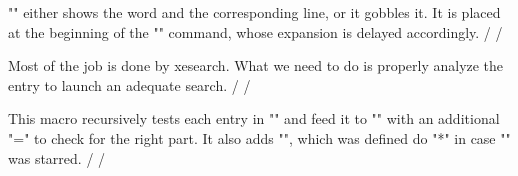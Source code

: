 \documentclass[%
]{codedoc}
\begin{document}
\DefineMacro\xi@Mark
\DefineMacro\xi@empty
\DefineMacro\xi@end
\DefineMacro\xi@Lists
"\xi@Mark" either shows the word and the corresponding line,
or it gobbles it. It is placed at the beginning of
the "\index" command, whose expansion is delayed accordingly.
/
\ifxi@mark
  \def\xi@Mark#1{***[#1:\the\inputlineno] }
\else
  \def\xi@Mark#1{}
\fi
\def\xi@empty{}
\def\xi@end{\xi@end}
\def\xi@Lists{}
/

\DefineMacro\IndexList
\DefineMacro\xi@IndexList
Most of the job is done by xesearch. What we need to do
is properly analyze the entry to launch an adequate search.
/
\def\IndexList{%
  \@ifstar{\def\xi@cs{*}\xi@IndexList}{\def\xi@cs{}\xi@IndexList}%
  }
\def\xi@IndexList#1#2{%
  \def\xi@ListName{#1}%
  \edef\xi@Lists{\xi@Lists#1,}%
  \unless\ifcsname#1@xeindex\endcsname
    \csname#1@xeindex\endcsname
/

\noindent
When a index list is created, we associate five xesearch
lists with it: one is for words and affixes that should index
themselves in lower case.
/
    \SearchList{#1@xeindex@ncs@normal@list}{%
      \def\xi@Word{##1}%
      \lowercase{\expandafter\index\expandafter{\xi@Mark\xi@Word##1}}}{}%
/

\noindent
Another one is for case-sensitive words and affixes.
/
    \SearchList{#1@xeindex@cs@normal@list}{%
      \expandafter\index\expandafter{\xi@Mark{##1}##1}}{}%
/

\noindent
And the last three are for words and affixes that launch
a special entry, which is stored in an associated command.
/
    \SearchList{#1@xeindex@ncs@special@list}{%
      \lowercase{\csname##1@#1@xeindex@entry\endcsname}{##1}}{}%
    \SearchList{#1@xeindex@cs@special@list}{%
      \csname##1@#1@xeindex@entry\endcsname{##1}}{}%
    \SearchList{#1@xeindex@affix@special@list}{%
      \csname\AffixFound @#1@xeindex@entry\endcsname{##1}}{}%
  \fi
  \xi@ParseList#2,\xi@end,%
  }
/

\DefineMacro\xi@ParseList
This macro recursively tests each entry in "\SearchList"
and feed it to "\xi@ParseEntry" with an additional "="
to check for the right part. It also adds "\xi@cs", which
was defined do "*" in case "\SearchList" was starred.
/
\def\xi@ParseList#1,{%
  \def\xi@temp{#1}%
  \ifx\xi@temp\xi@end
    \let\xi@next\relax
  \else
    \expandafter\xi@ParseEntry\xi@cs#1=\xi@end
    \let\xi@next\xi@ParseList
  \fi\xi@next
  }
/
\end{document}
